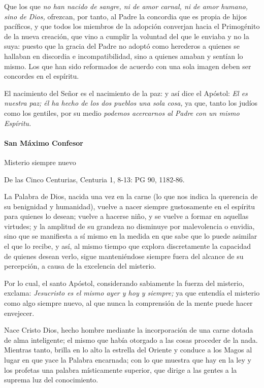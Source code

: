 \documentclass[]{article}
\let\oldparagraph\paragraph
\renewcommand{\paragraph}[1]{\oldparagraph{#1}\mbox{}}
\begin{document}
Que los que \emph{no han nacido de sangre, ni de amor carnal, ni de amor
humano, sino de Dios,} ofrezcan, por tanto, al Padre la concordia que es
propia de hijos pacíficos, y que todos los miembros de la adopción
converjan hacia el Primogénito de la nueva creación, que vino a cumplir
la voluntad del que le enviaba y no la suya: puesto que la gracia del
Padre no adoptó como herederos a quienes se hallaban en discordia e
incompatibilidad, sino a quienes amaban y sentían lo mismo. Los que han
sido reformados de acuerdo con una sola imagen deben ser concordes en el
espíritu.

El nacimiento del Señor es el nacimiento de la paz: y así dice el
Apóstol: \emph{El es nuestra paz; él ha hecho de los dos pueblos una
sola cosa,} ya que, tanto los judíos como los gentiles, por su medio
\emph{podemos acercarnos al Padre con un mismo Espíritu.}

\paragraph{San Máximo Confesor}\label{san-muxe1ximo-confesor}

Misterio siempre nuevo

De las Cinco Centurias, Centuria 1, 8-13: PG 90, 1182-86.

La Palabra de Dios, nacida una vez en la carne (lo que nos indica la
querencia de su benignidad y humanidad), vuelve a nacer siempre
gustosamente en el espíritu para quienes lo desean; vuelve a hacerse
niño, y se vuelve a formar en aquellas virtudes; y la amplitud de su
grandeza no disminuye por malevolencia o envidia, sino que se manifiesta
a sí mismo en la medida en que sabe que lo puede asimilar el que lo
recibe, y así, al mismo tiempo que explora discretamente la capacidad de
quienes desean verlo, sigue manteniéndose siempre fuera del alcance de
su percepción, a causa de la excelencia del misterio.

Por lo cual, el santo Apóstol, considerando sabiamente la fuerza del
misterio, exclama: \emph{Jesucristo es el mismo ayer y hoy y siempre;}
ya que entendía el misterio como algo siempre nuevo, al que nunca la
comprensión de la mente puede hacer envejecer.

Nace Cristo Dios, hecho hombre mediante la incorporación de una carne
dotada de alma inteligente; el mismo que había otorgado a las cosas
proceder de la nada. Mientras tanto, brilla en lo alto la estrella del
Oriente y conduce a los Magos al lugar en que yace la Palabra encarnada;
con lo que muestra que hay en la ley y los profetas una palabra
místicamente superior, que dirige a las gentes a la suprema luz del
conocimiento.
\end{document}
